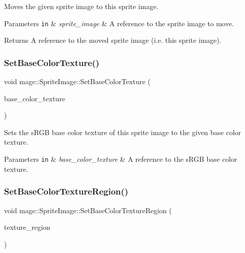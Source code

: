 Moves the given sprite image to this sprite image.


\begin{DoxyParams}[1]{Parameters}
\mbox{\tt in}  & {\em sprite\+\_\+image} & A reference to the sprite image to move. \\
\hline
\end{DoxyParams}
\begin{DoxyReturn}{Returns}
A reference to the moved sprite image (i.\+e. this sprite image). 
\end{DoxyReturn}
\hypertarget{classmage_1_1_sprite_image_a468fb3e862e4dd0ba46f49c4cffc8659}{}\label{classmage_1_1_sprite_image_a468fb3e862e4dd0ba46f49c4cffc8659} 
\subsubsection{\texorpdfstring{Set\+Base\+Color\+Texture()}{SetBaseColorTexture()}}
{\footnotesize\ttfamily void mage\+::\+Sprite\+Image\+::\+Set\+Base\+Color\+Texture (\begin{DoxyParamCaption}\item[{const \hyperlink{namespacemage_a1e01ae66713838a7a67d30e44c67703e}{Shared\+Ptr}$<$ const \hyperlink{classmage_1_1_texture}{Texture} $>$ \&}]{base\+\_\+color\+\_\+texture }\end{DoxyParamCaption})}

Sets the s\+R\+GB base color texture of this sprite image to the given base color texture.


\begin{DoxyParams}[1]{Parameters}
\mbox{\tt in}  & {\em base\+\_\+color\+\_\+texture} & A reference to the s\+R\+GB base color texture. \\
\hline
\end{DoxyParams}
\hypertarget{classmage_1_1_sprite_image_a5e98bd9b7fc39384625400187a90f82e}{}\label{classmage_1_1_sprite_image_a5e98bd9b7fc39384625400187a90f82e} 
\subsubsection{\texorpdfstring{Set\+Base\+Color\+Texture\+Region()}{SetBaseColorTextureRegion()}}
{\footnotesize\ttfamily void mage\+::\+Sprite\+Image\+::\+Set\+Base\+Color\+Texture\+Region (\begin{DoxyParamCaption}\item[{const R\+E\+CT \&}]{texture\+\_\+region }\end{DoxyParamCaption})}

